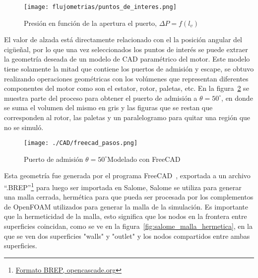 \begin{figure}
    \centering
    \texttt{[image: flujometrias/puntos\_de\_interes.png]}
    \caption{Presión en función de la apertura el puerto,
$\Delta P = f(l_{v})$}\label{fig:puntos_interes}
\end{figure}

%
El valor de alzada está directamente relacionado con el la posición angular del
cigüeñal, por lo que una vez seleccionados los puntos de interés se puede
extraer la geometría deseada de un modelo de CAD paramétrico del motor.
%
Este modelo tiene solamente la mitad que contiene los puertos de admisión y
escape, se obtuvo realizando operaciones geométricas con los volúmenes que
representan diferentes componentes del motor como son el estator, rotor,
paletas, etc.
%
En la figura~\ref{fig:admision_50} se muestra parte del proceso para obtener el
puerto de admisión a $\theta=50^{\circ}$, en donde se suma el volumen del mismo
en gris y las figuras que se restan que corresponden al rotor, las paletas y un
paralelogramo para quitar una región que no se simuló.

\begin{figure}
    \centering
    \texttt{[image: ./CAD/freecad\_pasos.png]}
    \caption{Puerto de admisión $\theta=50^{\circ}$Modelado con
FreeCAD}\label{fig:admision_50}
\end{figure}

Esta geometría fue generada por el programa FreeCAD~\parencite{freecad},
exportada a un archivo
``.BREP''\footnote{\href{https://dev.opencascade.org/doc/overview/html/specification\_\_brep\_format.html}{Formato
BREP, opencascade.org}} para luego ser importada en Salome\parencite{salome},
%
Salome se utiliza para generar una malla cerrada, hermética para que pueda ser
procesada por los complementos de OpenFOAM utilizados para generar la malla de
la simulación.
%
Es importante que la hermeticidad de la malla, esto significa que los nodos en
la frontera entre superficies coincidan, como se ve en la
figura~\ref{fig:salome_malla_hermetica}, en la que se ven dos superficies
"walls" y "outlet" y los nodos compartidos entre ambas superficies.
%
%
%

